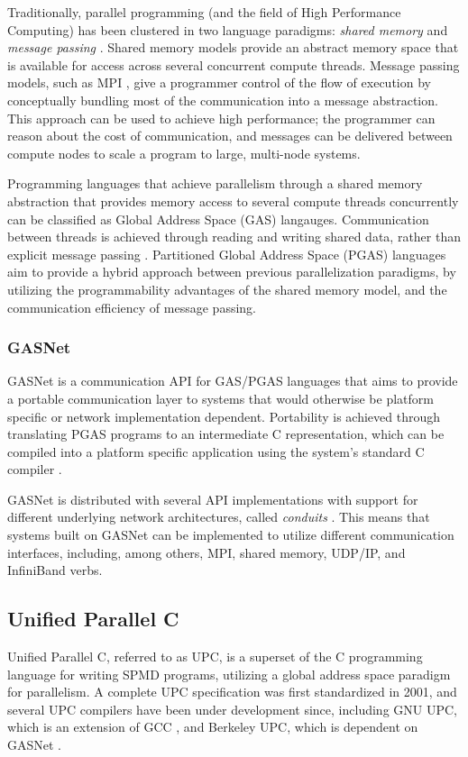 \documentclass{uit-report}
\begin{document}
Traditionally, parallel programming (and the field of High Performance Computing) has been clustered in two language paradigms: \emph{shared memory }and \emph{message passing} \cite{pgas_languages}.  Shared memory models provide an abstract memory space that is available for access across several concurrent compute threads. Message passing models, such as MPI \cite{MPI}, give a programmer control of the flow of execution by conceptually bundling most of the communication into a message abstraction. This approach can be used to achieve high performance; the programmer can reason about the cost of communication, and messages can be delivered between compute nodes to scale a program to large, multi-node systems.

Programming languages that achieve parallelism through a shared memory abstraction that provides memory access to several compute threads concurrently can be classified as Global Address Space (GAS) langauges. Communication between threads is achieved through reading and writing shared data, rather than explicit message passing \cite{gasnet_description}. Partitioned Global Address Space (PGAS) languages aim to provide a hybrid approach between previous parallelization paradigms, by utilizing the programmability advantages of the shared memory model, and the communication efficiency of message passing.

\subsubsection{GASNet}
GASNet is a communication API for GAS/PGAS languages that aims to provide a portable communication layer to systems that would otherwise be platform specific or network implementation dependent. Portability is achieved through translating PGAS programs to an intermediate C representation, which can be compiled into a platform specific application using the system's standard C compiler \cite{gasnet_description}.

GASNet is distributed with several API implementations with support for different underlying network architectures, called \emph{conduits} \cite{gasnetreadme}. This means that systems built on GASNet can be implemented to utilize different communication interfaces, including, among others, MPI, shared memory, UDP/IP, and InfiniBand verbs.

\subsection{Unified Parallel C}
Unified Parallel C, referred to as UPC, is a superset of the C programming language for writing SPMD programs, utilizing a global address space paradigm for parallelism. A complete UPC specification was first standardized in 2001, and several UPC compilers have been under development since, including GNU UPC, which is an extension of GCC \cite{web_gnu_upc}, and Berkeley UPC, which is dependent on GASNet \cite{web_berkeley_upc}.
\end{document}
